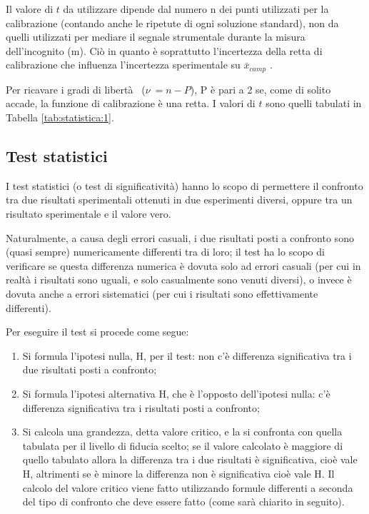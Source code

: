 Il valore di $t$ da utilizzare dipende dal numero n dei punti utilizzati per la calibrazione (contando anche le ripetute di ogni soluzione standard), non da quelli utilizzati per mediare il segnale strumentale durante la misura dell'incognito (m). Ciò in quanto è soprattutto l'incertezza della retta di calibrazione che influenza l'incertezza sperimentale su $\bar{x}_{camp}$ .

Per ricavare i gradi di libertà \nu\ ($\nu\ = n - P$), P è pari a 2 se, come di solito accade, la funzione di calibrazione è una retta. I valori di $t$ sono quelli tabulati in Tabella \ref{tab:statistica:1}.

\subsection{Test statistici}

I test statistici (o test di significatività) hanno lo scopo di permettere il confronto tra due risultati sperimentali ottenuti in due esperimenti diversi, oppure tra un risultato sperimentale e il valore vero.

Naturalmente, a causa degli errori casuali, i due risultati posti a confronto sono (quasi sempre) numericamente differenti tra di loro; il test ha lo scopo di verificare se questa differenza numerica è dovuta solo ad errori casuali (per cui in realtà i risultati sono uguali, e solo casualmente sono venuti diversi), o invece è dovuta anche a errori sistematici (per cui i risultati sono effettivamente differenti).

Per eseguire il test si procede come segue:
\begin{enumerate}
\item Si formula l'ipotesi nulla, H, per il test: non c'è differenza significativa tra i due risultati posti a confronto;
\item Si formula l'ipotesi alternativa H, che è l'opposto dell'ipotesi nulla: c'è differenza significativa tra i risultati posti a confronto;
\item Si calcola una grandezza, detta valore critico, e la si confronta con quella tabulata per il livello di fiducia scelto; se il valore calcolato è maggiore di quello tabulato allora la differenza tra i due risultati è significativa, cioè vale H, altrimenti se è minore la differenza non è significativa cioè vale H. Il calcolo del valore critico viene fatto utilizzando formule differenti a seconda del tipo di confronto che deve essere fatto (come sarà chiarito in seguito).
\end{enumerate}

